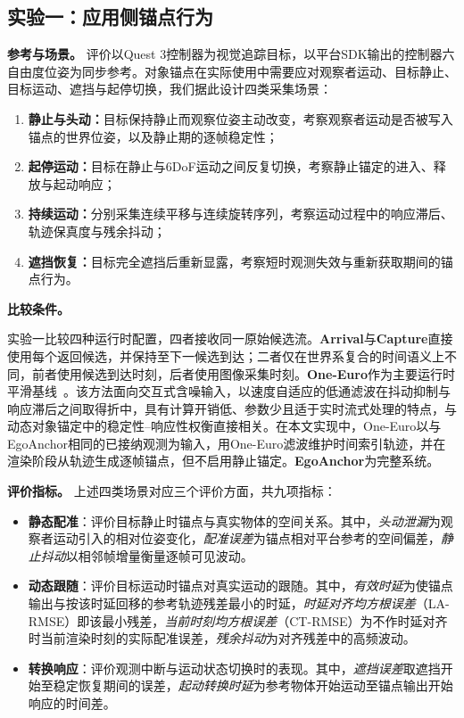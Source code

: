 \documentclass[review]{vgtc}
\begin{document}
\subsection{实验一：应用侧锚点行为}\label{sec:exp1-design}

\textbf{参考与场景。}
评价以Quest 3控制器为视觉追踪目标，以平台SDK输出的控制器六自由度位姿为同步参考。对象锚点在实际使用中需要应对观察者运动、目标静止、目标运动、遮挡与起停切换，我们据此设计四类采集场景：
\begin{enumerate}
  \item \textbf{静止与头动：}目标保持静止而观察位姿主动改变，考察观察者运动是否被写入锚点的世界位姿，以及静止期的逐帧稳定性；
  \item \textbf{起停运动：}目标在静止与6DoF运动之间反复切换，考察静止锚定的进入、释放与起动响应；
  \item \textbf{持续运动：}分别采集连续平移与连续旋转序列，考察运动过程中的响应滞后、轨迹保真度与残余抖动；
  \item \textbf{遮挡恢复：}目标完全遮挡后重新显露，考察短时观测失效与重新获取期间的锚点行为。
\end{enumerate}

\textbf{比较条件。}

实验一比较四种运行时配置，四者接收同一原始候选流。\textbf{Arrival}与\textbf{Capture}直接使用每个返回候选，并保持至下一候选到达；二者仅在世界系复合的时间语义上不同，前者使用候选到达时刻，后者使用图像采集时刻。\textbf{One-Euro}作为主要运行时平滑基线~\cite{casiez2012oneeuro}。该方法面向交互式含噪输入，以速度自适应的低通滤波在抖动抑制与响应滞后之间取得折中，具有计算开销低、参数少且适于实时流式处理的特点，与动态对象锚定中的稳定性--响应性权衡直接相关。在本文实现中，One-Euro以与EgoAnchor相同的已接纳观测为输入，用One-Euro滤波维护时间索引轨迹，并在渲染阶段从轨迹生成逐帧锚点，但不启用静止锚定。\textbf{EgoAnchor}为完整系统。

\textbf{评价指标。}
上述四类场景对应三个评价方面，共九项指标：

\begin{itemize}[leftmargin=1.6em,itemsep=2pt,topsep=2pt]
  \item \textbf{静态配准}：评价目标静止时锚点与真实物体的空间关系。其中，\emph{头动泄漏}为观察者运动引入的相对位姿变化，\emph{配准误差}为锚点相对平台参考的空间偏差，\emph{静止抖动}以相邻帧增量衡量逐帧可见波动。
  \item \textbf{动态跟随}：评价目标运动时锚点对真实运动的跟随。其中，\emph{有效时延}为使锚点输出与按该时延回移的参考轨迹残差最小的时延，\emph{时延对齐均方根误差}（LA-RMSE）即该最小残差，\emph{当前时刻均方根误差}（CT-RMSE）为不作时延对齐时当前渲染时刻的实际配准误差，\emph{残余抖动}为对齐残差中的高频波动。
  \item \textbf{转换响应}：评价观测中断与运动状态切换时的表现。其中，\emph{遮挡误差}取遮挡开始至稳定恢复期间的误差，\emph{起动转换时延}为参考物体开始运动至锚点输出开始响应的时间差。
\end{itemize}
\end{document}
